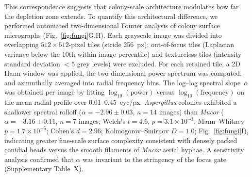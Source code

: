 %
%


%
%

This correspondence suggests that colony-scale architecture modulates
how far the depletion zone extends.  To quantify this architectural
difference, we performed automated two-dimensional Fourier analysis of
colony surface micrographs (Fig.~\ref{fig:fungi}G,H).  Each grayscale
image was divided into overlapping $512 \times 512$-pixel tiles
(stride 256~px); out-of-focus tiles (Laplacian variance below the
10th within-image percentile) and textureless tiles (intensity
standard deviation $< 5$ grey levels) were excluded.  For each
retained tile, a 2D Hann window was applied, the two-dimensional power
spectrum was computed, and azimuthally averaged into radial frequency
bins.  The log--log spectral slope~$\alpha$ was obtained per image by
fitting $\log_{10}(\mathrm{power})$ versus
$\log_{10}(\mathrm{frequency})$ on the mean radial profile over
0.01--0.45~cyc/px.  \textit{Aspergillus} colonies exhibited a
shallower spectral rolloff ($\alpha = -2.96 \pm 0.03$, $n = 14$
images) than \textit{Mucor} ($\alpha = -3.16 \pm 0.11$, $n = 7$
images; Welch's $t = 4.6$, $p = 3.1 \times 10^{-3}$; Mann--Whitney
$p = 1.7 \times 10^{-5}$; Cohen's $d = 2.96$; Kolmogorov--Smirnov
$D = 1.0$; Fig.~\ref{fig:fungi}I), indicating greater fine-scale
surface complexity consistent with densely packed conidial heads
versus the smooth filaments of \textit{Mucor} aerial hyphae.  A
sensitivity analysis confirmed that $\alpha$ was invariant to the
stringency of the focus gate (Supplementary Table~X).

